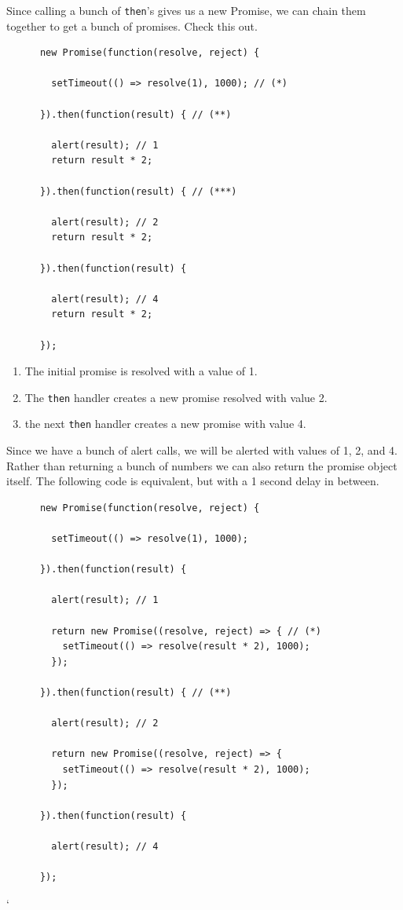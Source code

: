 \documentclass{article}
\begin{document}
    Since calling a bunch of \texttt{then}'s gives us a new Promise, we can chain them together to get a bunch of promises. Check this out. 

    \begin{lstlisting}
      new Promise(function(resolve, reject) {

        setTimeout(() => resolve(1), 1000); // (*)

      }).then(function(result) { // (**)

        alert(result); // 1
        return result * 2;

      }).then(function(result) { // (***)

        alert(result); // 2
        return result * 2;

      }).then(function(result) {

        alert(result); // 4
        return result * 2;

      });
    \end{lstlisting}

    \begin{enumerate}
      \item The initial promise is resolved with a value of 1. 
      \item The \texttt{then} handler creates a new promise resolved with value 2. 
      \item the next \texttt{then} handler creates a new promise with value 4. 
    \end{enumerate}

    Since we have a bunch of alert calls, we will be alerted with values of 1, 2, and 4. Rather than returning a bunch of numbers we can also return the promise object itself. The following code is equivalent, but with a 1 second delay in between. 

    \begin{lstlisting}
      new Promise(function(resolve, reject) {

        setTimeout(() => resolve(1), 1000);

      }).then(function(result) {

        alert(result); // 1

        return new Promise((resolve, reject) => { // (*)
          setTimeout(() => resolve(result * 2), 1000);
        });

      }).then(function(result) { // (**)

        alert(result); // 2

        return new Promise((resolve, reject) => {
          setTimeout(() => resolve(result * 2), 1000);
        });

      }).then(function(result) {

        alert(result); // 4

      });
    \end{lstlisting}`
\end{document}
